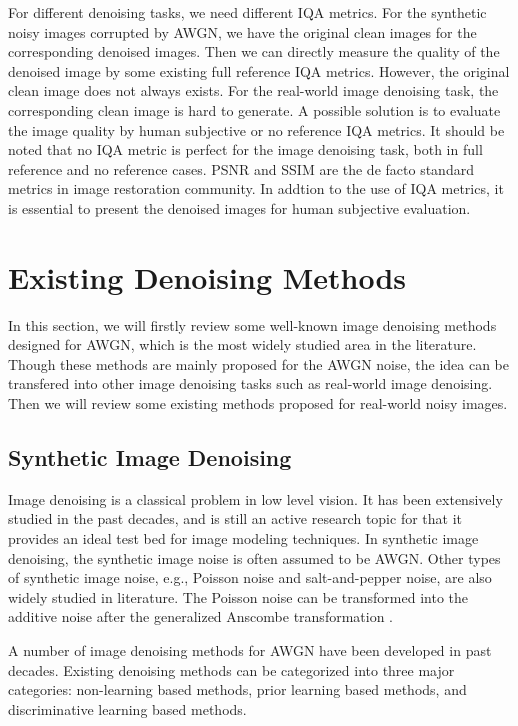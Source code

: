 For different denoising tasks, we need different IQA metrics. For the synthetic noisy images corrupted by AWGN, we have the original clean images for the corresponding denoised images. Then we can directly measure the quality of the denoised image by some existing full reference IQA metrics. However, the original clean image does not always exists. For the real-world image denoising task, the corresponding clean image is hard to generate. A possible solution is to evaluate the image quality by human subjective or no reference IQA metrics. It should be noted that no IQA metric is perfect for the image denoising task, both in full reference and no reference cases. PSNR and SSIM are the de facto standard metrics in image restoration community. In addtion to the use of IQA metrics, it is essential to present the denoised images for human subjective evaluation.


\section{Existing Denoising Methods}

In this section, we will firstly review some well-known image denoising methods designed for AWGN, which is the most widely studied area in the literature. Though these methods are mainly proposed for the AWGN noise, the idea can be transfered into other image denoising tasks such as real-world image denoising. Then we will review some existing methods proposed for real-world noisy images.

\subsection{Synthetic Image Denoising}
\label{sec:review:sys}

Image denoising is a classical problem in low level vision. It has been extensively studied in the past decades, and is still an active research topic for that it provides an ideal test bed for image modeling techniques. In synthetic image denoising, the synthetic image noise is often assumed to be AWGN. Other types of synthetic image noise, e.g., Poisson noise and salt-and-pepper noise, are also widely studied in literature. The Poisson noise can be transformed into the additive noise after the generalized Anscombe transformation \cite{makitalo2013optimal}.

A number of image denoising methods for AWGN have been developed in past decades. Existing denoising methods can be categorized into three major categories: non-learning based methods, prior learning based methods, and discriminative learning based methods. 

